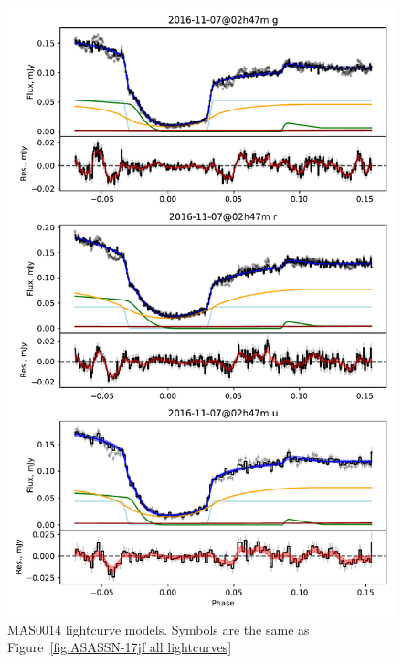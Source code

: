 \begin{figure}
    \centering
    \includegraphics[width=\textwidth]{figures/results/MASOT0014/MASOT0014_1.pdf}
    \caption{MAS0014 lightcurve models. Symbols are the same as Figure~\ref{fig:ASASSN-17jf all lightcurves}}
    \label{fig:MAS0014 all lightcurves}
\end{figure}
